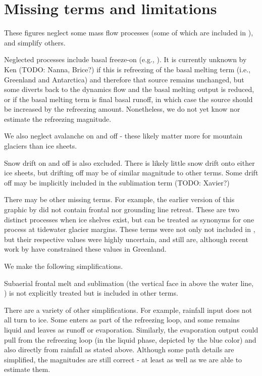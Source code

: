 \documentclass[jog]{igs}
\begin{document}
\section{Missing terms and limitations}
\label{sec:limits}

These figures neglect some mass flow processes (some of which are included in \citet[Fig. 2]{cogley_2011}), and simplify others.

Neglected processes include basal freeze-on (e.g., \citet{bell_2014}). It is currently unknown by Ken (TODO: Nanna,  Brice?) if this is refreezing of the basal melting term (i.e., \citet{karlsson_2021} Greenland and \citet{pattyn_2010} Antarctica) and therefore that source remains unchanged, but some diverts back to the dynamics flow and the basal melting output is reduced, or if the basal melting term is final basal runoff, in which case the source should be increased by the refreezing amount. Nonetheless, we do not yet know nor estimate the refreezing magnitude.

We also neglect avalanche on and off - these likely matter more for mountain glaciers than ice sheets.

Snow drift on and off is also excluded. There is likely little snow drift onto either ice sheets, but drifting off may be of similar magnitude to other terms. Some drift off may be implicitly included in the sublimation term (TODO: Xavier?)

There may be other missing terms. For example, the earlier version of this graphic by \citet[Fig. 2]{cogley_2011} did not contain frontal nor grounding line retreat. These are two distinct processes when ice shelves exist, but can be treated as synonyms for one process at tidewater glacier margins. These terms were not only not included in \citet{cogley_2011}, but their respective values were highly uncertain, and still are, although recent work by \citet{kochtitzky_2023,greene_2024} have constrained these values in Greenland. 

We make the following simplifications.

Subaerial frontal melt and sublimation (the vertical face in above the water line, \citet[Fig. 2]{cogley_2011}) is not explicitly treated but is included in other terms.

There are a variety of other simplifications. For example, rainfall input does not all turn to ice. Some enters as part of the refreezing loop, and some remains liquid and leaves as runoff or evaporation. Similarly, the evaporation output could pull from the refreezing loop (in the liquid phase, depicted by the blue color) and also directly from rainfall as stated above. Although some path details are simplified, the magnitudes are still correct - at least as well as we are able to estimate them.
\end{document}
